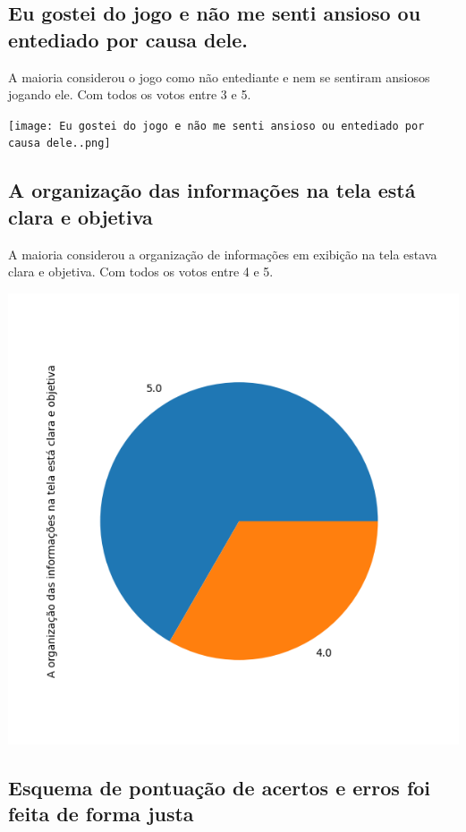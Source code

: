 \documentclass[12pt]{article}
\begin{document}
\subsection{Eu gostei do jogo e não me senti ansioso ou entediado por causa dele.}

A maioria considerou o jogo como não entediante e nem se sentiram ansiosos jogando ele. Com todos os votos entre 3 e 5.

\begin{center}
  \texttt{[image: Eu gostei do jogo e não me senti ansioso ou entediado por causa dele..png]}
\end{center}

\subsection{A organização das informações na tela está clara e objetiva}

A maioria considerou a organização de informações em exibição na tela estava clara e objetiva. Com todos os votos entre 4 e 5.


\begin{center}
  \includegraphics[scale=0.4]{A organização das informações na tela está clara e objetiva.png}
\end{center}

\subsection{Esquema de pontuação de acertos e erros foi feita de forma justa}
\end{document}
